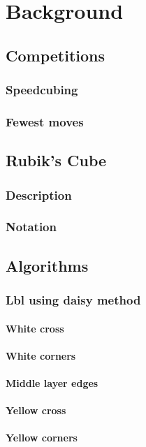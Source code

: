 \documentclass[a4paper,11pt]{kth-mag}
\begin{document}
\chapter{Background}
\section{Competitions}
\subsection{Speedcubing}
\subsection{Fewest moves}
\section{Rubik's Cube}
\subsection{Description}
\subsection{Notation}
\section{Algorithms}
\subsection{Lbl using daisy method}
\subsubsection{White cross}
\subsubsection{White corners}
\subsubsection{Middle layer edges}
\subsubsection{Yellow cross}
\subsubsection{Yellow corners}
\end{document}
